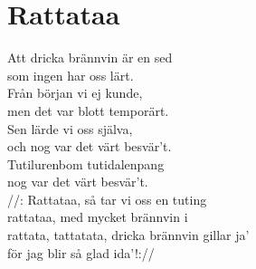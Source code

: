 \section{Rattataa}
Att dricka brännvin är en sed\\
som ingen har oss lärt.\\
Från början vi ej kunde,\\
men det var blott temporärt.\\
Sen lärde vi oss själva,\\
och nog var det värt besvär't.\\
Tutilurenbom tutidalenpang\\
nog var det värt besvär't.\\

//: Rattataa, så tar vi oss en tuting\\
rattataa, med mycket brännvin i\\
rattata, tattatata, dricka brännvin gillar ja'\\
för jag blir så glad ida'!://\\